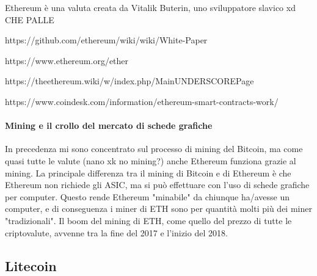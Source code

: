 \documentclass {article}
\begin{document}
Ethereum è una valuta creata da Vitalik Buterin, uno sviluppatore slavico xd CHE PALLE

https://github.com/ethereum/wiki/wiki/White-Paper

https://www.ethereum.org/ether

https://theethereum.wiki/w/index.php/MainUNDERSCOREPage

https://www.coindesk.com/information/ethereum-smart-contracts-work/


\paragraph {Mining e il crollo del mercato di schede grafiche}


In precedenza mi sono concentrato sul processo di mining del Bitcoin, ma come quasi tutte le valute (nano xk no mining?) anche Ethereum funziona grazie al mining.
La principale differenza tra il mining di Bitcoin e di Ethereum è che Ethereum non richiede gli ASIC, ma si può effettuare con l'uso di schede grafiche per computer.
Questo rende Ethereum "minabile" da chiunque ha/avesse un computer, e di conseguenza i miner di ETH sono per quantità molti più dei miner "tradizionali".
Il boom del mining di ETH, come quello del prezzo di tutte le criptovalute, avvenne tra la fine del 2017 e l'inizio del 2018.


\subsection {Litecoin}
\end{document}
